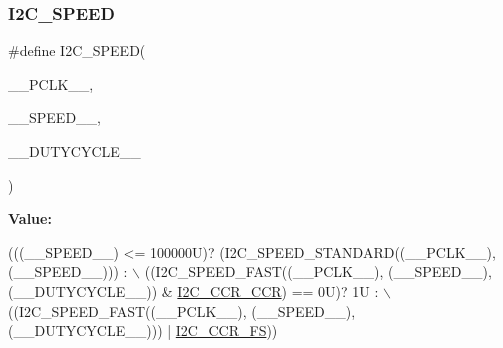 \subsubsection{\texorpdfstring{I2\+C\+\_\+\+S\+P\+E\+ED}{I2C\_SPEED}}
{\footnotesize\ttfamily \#define I2\+C\+\_\+\+S\+P\+E\+ED(\begin{DoxyParamCaption}\item[{}]{\+\_\+\+\_\+\+P\+C\+L\+K\+\_\+\+\_\+,  }\item[{}]{\+\_\+\+\_\+\+S\+P\+E\+E\+D\+\_\+\+\_\+,  }\item[{}]{\+\_\+\+\_\+\+D\+U\+T\+Y\+C\+Y\+C\+L\+E\+\_\+\+\_\+ }\end{DoxyParamCaption})}

{\bfseries Value\+:}
\begin{DoxyCode}
(((\_\_SPEED\_\_) <= 100000U)? (I2C\_SPEED\_STANDARD((\_\_PCLK\_\_), (\_\_SPEED\_\_))) : \(\backslash\)
                                                                  ((I2C\_SPEED\_FAST((\_\_PCLK\_\_), (\_\_SPEED\_\_),
       (\_\_DUTYCYCLE\_\_)) & \hyperlink{group___peripheral___registers___bits___definition_ga5c8cb2bd83dd7dbdcf6ca4bbf4a841de}{I2C\_CCR\_CCR}) == 0U)? 1U : \(\backslash\)
                                                                  ((I2C\_SPEED\_FAST((\_\_PCLK\_\_), (\_\_SPEED\_\_),
       (\_\_DUTYCYCLE\_\_))) | \hyperlink{group___peripheral___registers___bits___definition_gaea64e5d7eba609ac9a84964bc0bc2def}{I2C\_CCR\_FS}))
\end{DoxyCode}
